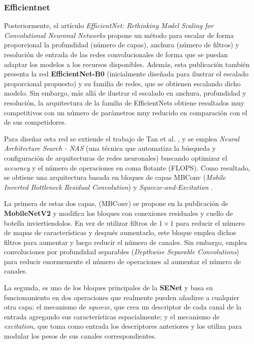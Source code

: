 

\subsubsection{Efficientnet}
Posteriormente, el artículo \textit{EfficientNet: Rethinking Model Scaling for Convolutional Neuronal Networks} \cite{efficientnet} propone un método para escalar de forma proporcional la profundidad (número de capas), anchura (número de filtros) y resolución de entrada de las redes convolucionales de forma que se puedan adaptar los modelos a los recursos disponibles. Además, esta publicación también presenta la red \textbf{EfficientNet-B0} (inicialmente diseñada para ilustrar el escalado proporcional propuesto) y su familia de redes, que se obtienen escalando dicho modelo. Sin embargo, más allá de ilustrar el escalado en anchura, profundidad y resolución, la arquitectura de la familia de EfficientNets obtiene resultados muy competitivos con un número de parámetros muy reducido en comparación con el de sus competidores.

Para diseñar esta red se extiende el trabajo de Tan et al. \cite{mnasnet}, y se emplea \textit{Neural Architecture Search - NAS} (una técnica que automatiza la búsqueda y configuración de arquitecturas de redes neuronales) buscando optimizar el \textit{accuracy}  y el número de operaciones en coma flotante (FLOPS). Como resultado, se obtiene una arquitectura basada en bloques de capas MBConv (\textit{Mobile Inverted Bottleneck Residual Convolution}) \cite{mobilenetv2} y \textit{Squeeze-and-Excitation} \cite{senet}.

La primera de estas dos capas, (MBConv) se propone en la publicación de \textbf{MobileNetV2} \cite{mobilenetv2} y modifica los bloques con conexiones residuales y cuello de botella inviertiendolos. En vez de utilizar filtros de $1\times1$ para reducir el número de mapas de características y después aumentarlo, este bloque emplea dichos filtros para aumentar y luego reducir el número de canales. Sin embargo, emplea convoluciones por profundidad separables (\textit{Depthwise Separable Convolutions}) para reducir enormemente el número de operaciones al aumentar el número de canales. 

La segunda, es uno de los bloques principales de la \textbf{SENet} \cite{senet} y basa su funcionamiento en dos operaciones que realmente pueden añadirse a cualquier otra capa: el mecanismo de \textit{squeeze}, que crea un descriptor de cada canal de la entrada agregando sus características espacialmente; y el mecanismo de \textit{excitation}, que toma como entrada los descriptores anteriores y los utiliza para modular los pesos de sus canales correspondientes.


